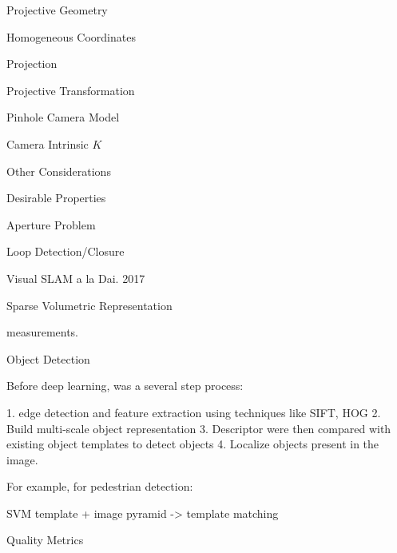\begin{section}
\begin{subsubsection}
\begin{subsubsection}
\begin{subsubsection}
\begin{section}{Projective Geometry}
\begin{subsection}{Homogeneous Coordinates}
\begin{subsubsection}
{\begin{subsubsection}{Projection}
\begin{subsubsection}{Projective Transformation}
\begin{subsection}
\begin{subsubsection}
\begin{subsubsection}
\begin{subsubsection}
{\begin{subsubsection}
\begin{subsection}
\begin{subsection} {Pinhole Camera Model}
\begin{subsection} {Camera Intrinsic $K$}
\begin{subsection}
\begin{subsection}
\begin{subsubsection}{Other Considerations}
{\begin{subsection}
\begin{subsubsection}{Desirable Properties}
\begin{section}
\begin{subsection}
\begin{subsection}
\begin{subsection}
\begin{section}
\begin{subsection}
\begin{subsubsection}
\begin{subsubsection}
\begin{subsection}
\begin{section}
\begin{subsection}
\begin{subsubsection}{Aperture Problem}
\begin{subsubsection}
{\begin{section}
\begin{subsubsection}
\begin{subsubsection}
\begin{subsubsection}
\begin{subsection}
\begin{subsection}
\begin{subsection}
\begin{subsection}
\begin{subsection}
\begin{subsection}
\begin{subsection}
\begin{subsubsection}
{\begin{subsubsection}
{\begin{subsubsection}
\begin{section}
\begin{section}
\begin{section}
\begin{subsubsection}
\begin{subsubsection}{Loop Detection/Closure}
\begin{subsubsection}{Visual SLAM a la Dai. 2017}
\begin{subsubsection}{Sparse Volumetric Representation}
\begin{subsection}
measurements.



\begin{section}{Object Detection}

Before deep learning,  was a several step process: 

1. edge detection and feature extraction using techniques like SIFT, HOG 
2. Build multi-scale object representation
3. Descriptor were then compared with existing object templates to detect objects
4. Localize objects present in the image.

For example, for pedestrian detection:

SVM template + image pyramid -> template matching

\begin{subsubsection}{ Quality Metrics

}
\end{subsubsection}
\end{section}
\end{subsection}
\end{subsubsection}
\end{subsubsection}
\end{subsubsection}
\end{subsubsection}
\end{section}
\end{section}
\end{section}
\end{subsubsection}}
\end{subsubsection}}
\end{subsubsection}
\end{subsection}
\end{subsection}
\end{subsection}
\end{subsection}
\end{subsection}
\end{subsection}
\end{subsection}
\end{subsubsection}
\end{subsubsection}
\end{subsubsection}
\end{section}}
\end{subsubsection}
\end{subsubsection}
\end{subsection}
\end{section}
\end{subsection}
\end{subsubsection}
\end{subsubsection}
\end{subsection}
\end{section}
\end{subsection}
\end{subsection}
\end{subsection}
\end{section}
\end{subsubsection}
\end{subsection}}
\end{subsubsection}
\end{subsection}
\end{subsection}
\end{subsection}
\end{subsection}
\end{subsection}
\end{subsubsection}}
\end{subsubsection}
\end{subsubsection}
\end{subsubsection}
\end{subsection}
\end{subsubsection}
\end{subsubsection}}
\end{subsubsection}
\end{subsection}
\end{section}
\end{subsubsection}
\end{subsubsection}
\end{subsubsection}
\end{section}
